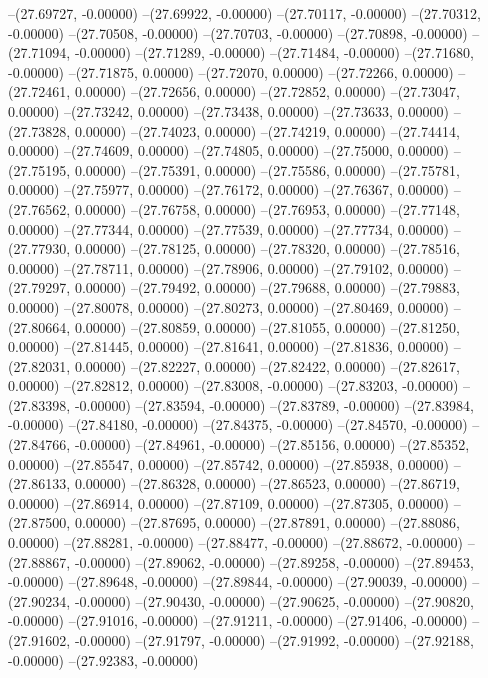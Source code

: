 --(27.69727, -0.00000)
--(27.69922, -0.00000)
--(27.70117, -0.00000)
--(27.70312, -0.00000)
--(27.70508, -0.00000)
--(27.70703, -0.00000)
--(27.70898, -0.00000)
--(27.71094, -0.00000)
--(27.71289, -0.00000)
--(27.71484, -0.00000)
--(27.71680, -0.00000)
--(27.71875, 0.00000)
--(27.72070, 0.00000)
--(27.72266, 0.00000)
--(27.72461, 0.00000)
--(27.72656, 0.00000)
--(27.72852, 0.00000)
--(27.73047, 0.00000)
--(27.73242, 0.00000)
--(27.73438, 0.00000)
--(27.73633, 0.00000)
--(27.73828, 0.00000)
--(27.74023, 0.00000)
--(27.74219, 0.00000)
--(27.74414, 0.00000)
--(27.74609, 0.00000)
--(27.74805, 0.00000)
--(27.75000, 0.00000)
--(27.75195, 0.00000)
--(27.75391, 0.00000)
--(27.75586, 0.00000)
--(27.75781, 0.00000)
--(27.75977, 0.00000)
--(27.76172, 0.00000)
--(27.76367, 0.00000)
--(27.76562, 0.00000)
--(27.76758, 0.00000)
--(27.76953, 0.00000)
--(27.77148, 0.00000)
--(27.77344, 0.00000)
--(27.77539, 0.00000)
--(27.77734, 0.00000)
--(27.77930, 0.00000)
--(27.78125, 0.00000)
--(27.78320, 0.00000)
--(27.78516, 0.00000)
--(27.78711, 0.00000)
--(27.78906, 0.00000)
--(27.79102, 0.00000)
--(27.79297, 0.00000)
--(27.79492, 0.00000)
--(27.79688, 0.00000)
--(27.79883, 0.00000)
--(27.80078, 0.00000)
--(27.80273, 0.00000)
--(27.80469, 0.00000)
--(27.80664, 0.00000)
--(27.80859, 0.00000)
--(27.81055, 0.00000)
--(27.81250, 0.00000)
--(27.81445, 0.00000)
--(27.81641, 0.00000)
--(27.81836, 0.00000)
--(27.82031, 0.00000)
--(27.82227, 0.00000)
--(27.82422, 0.00000)
--(27.82617, 0.00000)
--(27.82812, 0.00000)
--(27.83008, -0.00000)
--(27.83203, -0.00000)
--(27.83398, -0.00000)
--(27.83594, -0.00000)
--(27.83789, -0.00000)
--(27.83984, -0.00000)
--(27.84180, -0.00000)
--(27.84375, -0.00000)
--(27.84570, -0.00000)
--(27.84766, -0.00000)
--(27.84961, -0.00000)
--(27.85156, 0.00000)
--(27.85352, 0.00000)
--(27.85547, 0.00000)
--(27.85742, 0.00000)
--(27.85938, 0.00000)
--(27.86133, 0.00000)
--(27.86328, 0.00000)
--(27.86523, 0.00000)
--(27.86719, 0.00000)
--(27.86914, 0.00000)
--(27.87109, 0.00000)
--(27.87305, 0.00000)
--(27.87500, 0.00000)
--(27.87695, 0.00000)
--(27.87891, 0.00000)
--(27.88086, 0.00000)
--(27.88281, -0.00000)
--(27.88477, -0.00000)
--(27.88672, -0.00000)
--(27.88867, -0.00000)
--(27.89062, -0.00000)
--(27.89258, -0.00000)
--(27.89453, -0.00000)
--(27.89648, -0.00000)
--(27.89844, -0.00000)
--(27.90039, -0.00000)
--(27.90234, -0.00000)
--(27.90430, -0.00000)
--(27.90625, -0.00000)
--(27.90820, -0.00000)
--(27.91016, -0.00000)
--(27.91211, -0.00000)
--(27.91406, -0.00000)
--(27.91602, -0.00000)
--(27.91797, -0.00000)
--(27.91992, -0.00000)
--(27.92188, -0.00000)
--(27.92383, -0.00000)
